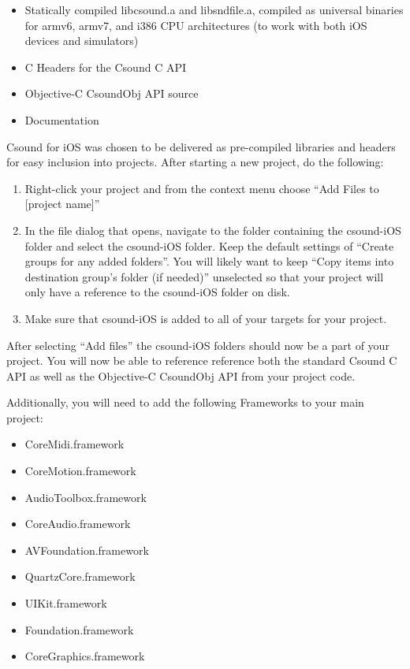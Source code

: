 \documentclass[11pt]{article}
\begin{document}
\begin{itemize}
\item Statically compiled libcsound.a and libsndfile.a, compiled as universal binaries for armv6, armv7, and i386 CPU architectures (to work with both iOS devices and simulators)
\item C Headers for the Csound C API
\item Objective-C CsoundObj API source
\item Documentation
\end{itemize}

Csound for iOS was chosen to be delivered as pre-compiled libraries and headers for easy inclusion into projects.  After starting a new project, do the following:

\begin{enumerate}
\item Right-click your project and from the context menu choose ``Add Files to [project name]''
\item In the file dialog that opens, navigate to the folder containing the csound-iOS folder and select the csound-iOS folder. Keep the default settings of ``Create groups for any added folders''.  You will likely want to keep ``Copy items into destination group's folder (if needed)'' unselected so that your project will only have a reference to the csound-iOS folder on disk.
\item Make sure that csound-iOS is added to all of your targets for your project.
\end{enumerate}

After selecting ``Add files'' the csound-iOS folders should now be a part of your project.  You will now be able to reference reference both the standard Csound C API as well as the Objective-C CsoundObj API from your project code.

Additionally, you will need to add the following Frameworks to your main project:

\begin{itemize}
  \item CoreMidi.framework
  \item CoreMotion.framework
  \item AudioToolbox.framework
  \item CoreAudio.framework
  \item AVFoundation.framework
  \item QuartzCore.framework
  \item UIKit.framework
  \item Foundation.framework
  \item CoreGraphics.framework
\end{itemize}
\end{document}
